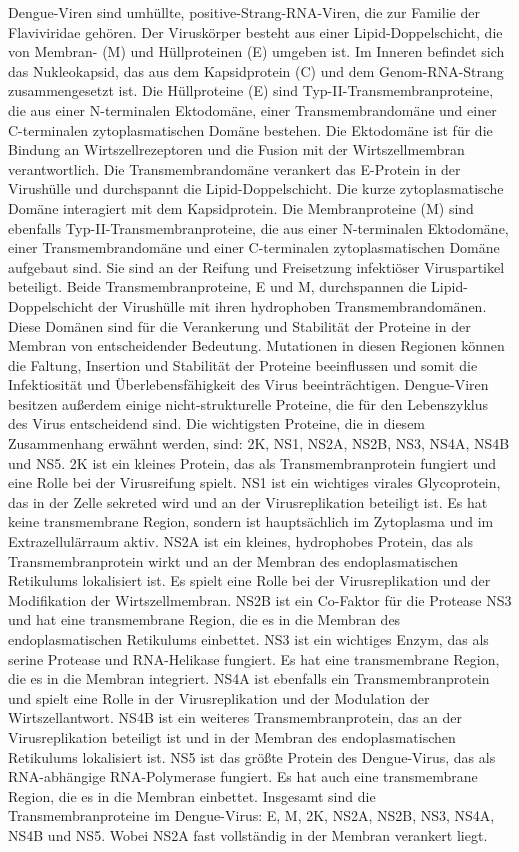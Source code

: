 \documentclass[german,version-2022-01]{uzl-thesis}
\begin{document}
Dengue-Viren sind umh\"ullte, positive-Strang-RNA-Viren, die zur Familie der Flaviviridae geh\"oren. Der Virusk\"orper besteht aus einer Lipid-Doppelschicht, die von Membran- (M) und H\"ullproteinen (E) umgeben ist. Im Inneren befindet sich das Nukleokapsid, das aus dem Kapsidprotein (C) und dem Genom-RNA-Strang zusammengesetzt ist. Die H\"ullproteine (E) sind Typ-II-Transmembranproteine, die aus einer N-terminalen Ektodom\"ane, einer Transmembrandom\"ane und einer C-terminalen zytoplasmatischen Dom\"ane bestehen. Die Ektodom\"ane ist f\"ur die Bindung an Wirtszellrezeptoren und die Fusion mit der Wirtszellmembran verantwortlich. Die Transmembrandom\"ane verankert das E-Protein in der Virush\"ulle und durchspannt die Lipid-Doppelschicht. Die kurze zytoplasmatische Dom\"ane interagiert mit dem Kapsidprotein. Die Membranproteine (M) sind ebenfalls Typ-II-Transmembranproteine, die aus einer N-terminalen Ektodom\"ane, einer Transmembrandom\"ane und einer C-terminalen zytoplasmatischen Dom\"ane aufgebaut sind. Sie sind an der Reifung und Freisetzung infekti\"oser Viruspartikel beteiligt. Beide Transmembranproteine, E und M, durchspannen die Lipid-Doppelschicht der Virush\"ulle mit ihren hydrophoben Transmembrandom\"anen. Diese Dom\"anen sind f\"ur die Verankerung und Stabilit\"at der Proteine in der Membran von entscheidender Bedeutung. Mutationen in diesen Regionen k\"onnen die Faltung, Insertion und Stabilit\"at der Proteine beeinflussen und somit die Infektiosit\"at und \"Uberlebensf\"ahigkeit des Virus beeintr\"achtigen. Dengue-Viren besitzen au\ss{}erdem einige nicht-strukturelle Proteine, die f\"ur den Lebenszyklus des Virus entscheidend sind. Die wichtigsten Proteine, die in diesem Zusammenhang erw\"ahnt werden, sind: 2K, NS1, NS2A, NS2B, NS3, NS4A, NS4B und NS5. 2K ist ein kleines Protein, das als Transmembranprotein fungiert und eine Rolle bei der Virusreifung spielt. NS1 ist ein wichtiges virales Glycoprotein, das in der Zelle sekreted wird und an der Virusreplikation beteiligt ist. Es hat keine transmembrane Region, sondern ist haupts\"achlich im Zytoplasma und im Extrazellul\"arraum aktiv. NS2A ist ein kleines, hydrophobes Protein, das als Transmembranprotein wirkt und an der Membran des endoplasmatischen Retikulums lokalisiert ist. Es spielt eine Rolle bei der Virusreplikation und der Modifikation der Wirtszellmembran. NS2B ist ein Co-Faktor f\"ur die Protease NS3 und hat eine transmembrane Region, die es in die Membran des endoplasmatischen Retikulums einbettet. NS3 ist ein wichtiges Enzym, das als serine Protease und RNA-Helikase fungiert. Es hat eine transmembrane Region, die es in die Membran integriert. NS4A ist ebenfalls ein Transmembranprotein und spielt eine Rolle in der Virusreplikation und der Modulation der Wirtszellantwort. NS4B ist ein weiteres Transmembranprotein, das an der Virusreplikation beteiligt ist und in der Membran des endoplasmatischen Retikulums lokalisiert ist. NS5 ist das gr\"o\ss{}te Protein des Dengue-Virus, das als RNA-abh\"angige RNA-Polymerase fungiert. Es hat auch eine transmembrane Region, die es in die Membran einbettet.
Insgesamt sind die Transmembranproteine im Dengue-Virus: E, M, 2K, NS2A, NS2B, NS3, NS4A, NS4B und NS5. Wobei NS2A fast vollst\"andig in der Membran verankert liegt. 
\end{document}
